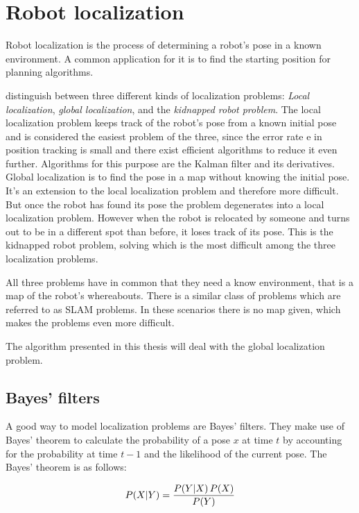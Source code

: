 \documentclass[Thesis.tex]{subfiles}
\begin{document}
\section{Robot localization}

Robot localization is the process of determining a robot's pose in a known environment. A common application for it is to find the starting position for planning algorithms. 

\citet{ThrunBurgardFox:2005} distinguish between three different kinds of localization problems: \emph{Local localization}, \emph{global localization}, and the \emph{kidnapped robot problem}. The local localization problem keeps track of the robot's pose from a known initial pose and is considered the easiest problem of the three, since the error rate e in position tracking is small and there exist efficient algorithms to reduce it even further. Algorithms for this purpose are the Kalman filter and its derivatives\cite[p.~40ff]{ThrunBurgardFox:2005}. Global localization is to find the pose in a map without knowing the initial pose. It's an extension to the local localization problem and therefore more difficult. But once the robot has found its pose the problem degenerates into a local localization problem. However when the robot is relocated by someone and turns out to be in a different spot than before, it loses track of its pose. This is the kidnapped robot problem, solving which is the most difficult among the three localization problems.

All three problems have in common that they need a know environment, that is a map of the robot's whereabouts. There is a similar class of problems which are referred to as \gls{SLAM} problems. In these scenarios there is no map given, which makes the problems even more difficult. 

The algorithm presented in this thesis will deal with the global localization problem. 

\subsection{Bayes' filters}
A good way to model localization problems are Bayes' filters. They make use of Bayes' theorem to calculate the probability of a pose $x$ at time $t$ by accounting for the probability at time $t-1$ and the likelihood of the current pose. The Bayes' theorem is as follows:

\begin{align}
\p[P]{X}{Y} = \frac{ \p[P]{Y}{X} P(X) } { P(Y) }
\end{align}
\end{document}
